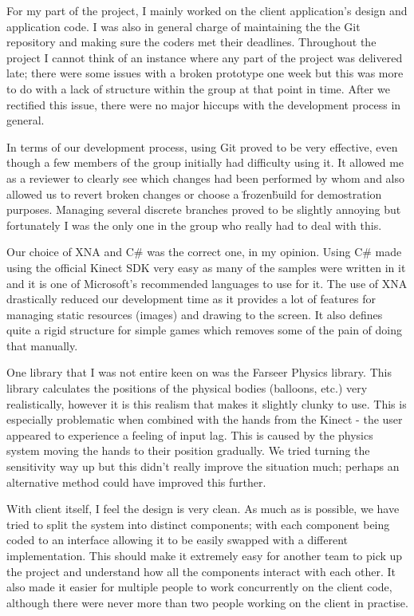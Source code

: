 For my part of the project, I mainly worked on the client application's design
and application code. I was also in general charge of maintaining the the Git
repository and making sure the coders met their deadlines. Throughout the
project I cannot think of an instance where any part of the project was
delivered late; there were some issues with a broken prototype one week but
this was more to do with a lack of structure within the group at that point in
time. After we rectified this issue, there were no major hiccups with the
development process in general.

In terms of our development process, using Git proved to be very effective, even
though a few members of the group initially had difficulty using it. It allowed
me as a reviewer to clearly see which changes had been performed by whom and
also allowed us to revert broken changes or choose a \"frozen\" build for 
demostration purposes. Managing several discrete branches proved to be slightly
annoying but fortunately I was the only one in the group who really had to deal
with this.

Our choice of XNA and C\# was the correct one, in my opinion. Using C\# made
using the official Kinect SDK very easy as many of the samples were written in
it and it is one of Microsoft's recommended languages to use for it. The use of
XNA drastically reduced our development time as it provides a lot of features
for managing static resources (images) and drawing to the screen. It also
defines quite a rigid structure for simple games which removes some of the pain
of doing that manually.

One library that I was not entire keen on was the Farseer Physics library. This
library calculates the positions of the physical bodies (balloons, etc.) very
realistically, however it is this realism that makes it slightly clunky to use.
This is especially problematic when combined with the hands from the Kinect -
the user appeared to experience a feeling of input lag. This is caused by the
physics system moving the hands to their position gradually. We tried turning
the sensitivity way up but this didn't really improve the situation much; 
perhaps an alternative method could have improved this further.

With client itself, I feel the design is very clean. As much as is possible, we
have tried to split the system into distinct components; with each component
being coded to an interface allowing it to be easily swapped with a different
implementation. This should make it extremely easy for another team to pick up
the project and understand how all the components interact with each other. It
also made it easier for multiple people to work concurrently on the client code,
although there were never more than two people working on the client in 
practise.

